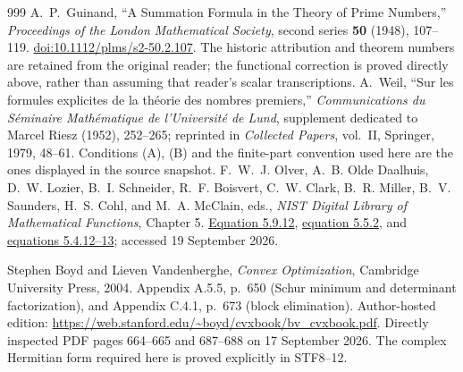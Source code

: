 \documentclass[11pt,a4paper]{article}
\begin{document}
\begin{thebibliography}{999}
A.~P.~Guinand, ``A Summation Formula in the Theory of Prime Numbers,''
\emph{Proceedings of the London Mathematical Society}, second series
\textbf{50} (1948), 107--119.
\href{https://doi.org/10.1112/plms/s2-50.2.107}{doi:10.1112/plms/s2-50.2.107}.
The historic attribution and theorem numbers are retained from the original
reader; the functional correction is proved directly above, rather than
assuming that reader's scalar transcriptions.
A.~Weil, ``Sur les formules explicites de la th\'eorie des nombres premiers,''
\emph{Communications du S\'eminaire Math\'ematique de l'Universit\'e de Lund},
supplement dedicated to Marcel Riesz (1952), 252--265; reprinted in
\emph{Collected Papers}, vol.~II, Springer, 1979, 48--61.
Conditions (A), (B) and the finite-part convention used here are the ones
displayed in the source snapshot.
F.~W.~J. Olver, A.~B. Olde Daalhuis, D.~W. Lozier, B.~I. Schneider,
R.~F. Boisvert, C.~W. Clark, B.~R. Miller, B.~V. Saunders, H.~S. Cohl,
and M.~A. McClain, eds., \emph{NIST Digital Library of Mathematical
Functions}, Chapter 5.
\href{https://dlmf.nist.gov/5.9.E12}{Equation 5.9.12},
\href{https://dlmf.nist.gov/5.5.E2}{equation 5.5.2}, and
\href{https://dlmf.nist.gov/5.4}{equations 5.4.12--13};
accessed 19 September 2026.

Stephen Boyd and Lieven Vandenberghe,
\emph{Convex Optimization}, Cambridge University Press, 2004.
Appendix A.5.5, p.~650 (Schur minimum and determinant factorization),
and Appendix C.4.1, p.~673 (block elimination).
Author-hosted edition: \url{https://web.stanford.edu/~boyd/cvxbook/bv_cvxbook.pdf}.
Directly inspected PDF pages 664--665 and 687--688 on 17 September 2026.
The complex Hermitian form required here is proved explicitly in STF8--12.



\end{thebibliography}
\end{document}
